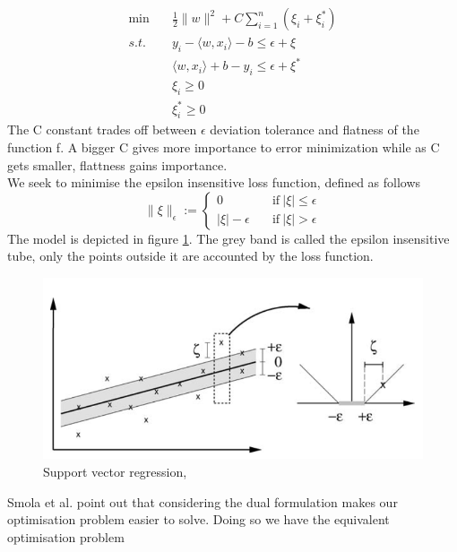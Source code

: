 \begin{equation}
    \begin{aligned}
        \min \quad& \frac{1}{2}\|w\|^2+C\sum\limits_{i=1}^n(\xi_i+\xi_i^*)
        \\
        s.t. \quad& y_i-\langle w, x_i\rangle-b\leq \epsilon+\xi
        \\
        \quad& \langle w, x_i\rangle +b-y_i\leq \epsilon+\xi^*
        \\
        \quad& \xi_i\geq0
        \\
        \quad& \xi_i^*\geq0
    \end{aligned}
\end{equation}
The C constant trades off between $\epsilon$ deviation tolerance and flatness of the function f. A bigger C gives more importance to error minimization while as C gets smaller, flattness gains importance.
\\
We seek to minimise the epsilon insensitive loss function, defined as follows
\begin{equation}
    \|\xi\|_\epsilon:=\begin{cases}
        0 \quad& \textrm{if} \ |\xi|\leq \epsilon
        \\
        |\xi|-\epsilon \quad& \textrm{if} \ |\xi| > \epsilon
    \end{cases}
\end{equation}
The model is depicted in figure \ref{fig:svm_simple}. The grey band is called the epsilon insensitive tube, only the points outside it are accounted by the loss function.
\begin{figure}
    \includegraphics[width=\textwidth]{images/svm_simple.png}    
    \caption{Support vector regression,\cite{learning_with_kernels}}
    \label{fig:svm_simple}
\end{figure}
Smola et al. \cite{smola2004tutorial} point out that considering the dual formulation makes our optimisation problem easier to solve. Doing so we have the equivalent optimisation problem
